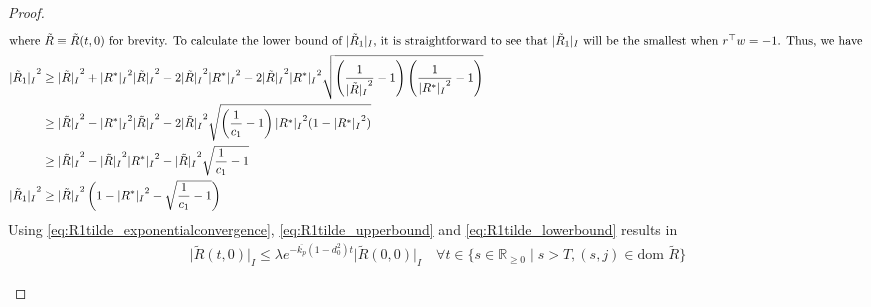 \documentclass{article}
\newcommand{\dom}{\text{dom }}
\newcommand{\R}[1]{\mathbb{R}^{#1}}
\newcommand{\brackets}[1]{\left(#1\right)}
\newcommand{\Rtilde}{\tilde{R}}
\newcommand{\normSOthree}[1]{{{\vert}#1 {\vert}_I}}
\newcommand{\expo}[1]{e^{#1}}
\newcommand{\Rstar}{{R^*}}
\begin{document}
\begin{proof}
\begin{align}
    \intertext{where $\Rtilde \equiv \Rtilde(t,0)$ for brevity. To calculate the lower bound of $\normSOthree{\Rtilde_1}$, it is straightforward to see that $\normSOthree{\Rtilde_1}$ will be the smallest when $r^\top w = -1$. Thus, we have }
    \normSOthree{\Rtilde_1}^2 &\geq \normSOthree{\Rtilde}^2 + \normSOthree{\Rstar}^2\normSOthree{\Rtilde}^2 - 2\normSOthree{\Rtilde}^2\normSOthree{\Rstar}^2 - 2\normSOthree{\Rtilde}^2\normSOthree{\Rstar}^2\sqrt{\brackets{\frac{1}{\normSOthree{\Rtilde}^2}-1}\brackets{\frac{1}{\normSOthree{\Rstar}^2}-1}}\nonumber\\
    &\geq \normSOthree{\Rtilde}^2 - \normSOthree{\Rstar}^2\normSOthree{\Rtilde}^2 - 2\normSOthree{\Rtilde}^2\sqrt{\brackets{\frac{1}{c_1}-1}{\normSOthree{\Rstar}^2(1 - \normSOthree{\Rstar}^2)}} \nonumber\\
    &\geq \normSOthree{\Rtilde}^2 - \normSOthree{\Rtilde}^2\normSOthree{\Rstar}^2 - \normSOthree{\Rtilde}^2\sqrt{\frac{1}{c_1}-1} \nonumber\\
    \normSOthree{\Rtilde_1}^2 &\geq \normSOthree{\Rtilde}^2\brackets{1 - \normSOthree{\Rstar}^2 - \sqrt{\frac{1}{c_1}-1}} \label{eq:R1tilde_lowerbound}
\end{align}
Using \eqref{eq:R1tilde_exponentialconvergence}, \eqref{eq:R1tilde_upperbound} and \eqref{eq:R1tilde_lowerbound} results in
\begin{align}\label{eq:eq20}
    \normSOthree{\Rtilde(t,0)} \leq \lambda \expo{-\overline{k_p}(1-d_0^2)t}\normSOthree{\Rtilde(0,0)} \quad \forall t\in \{s\in\R{}_{\geq 0} \mid s > T, (s,j)\in \dom\Rtilde\}
\end{align}
\begin{flushleft}

\end{flushleft}
\end{proof}
\end{document}
